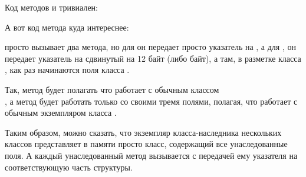 Код методов  и  тривиален:






А вот код метода  куда интереснее:




 просто вызывает два метода, но для  он передает просто указатель на , а для , он передает указатель на  сдвинутый на 12 байт (либо  байт), а там, 
в разметке класса , как раз начинаются поля класса .


Так, метод  будет полагать что работает с обычным классом \\
, а метод  будет работать только со своими тремя полями, полагая, 
что работает с обычным экземпляром класса .


Таким образом, можно сказать, что экземпляр класса-наследника нескольких классов представляет в памяти просто 
 класс, содержащий все унаследованные поля. А каждый унаследованный метод вызывается с передачей
ему указателя на соответствующую часть структуры.


